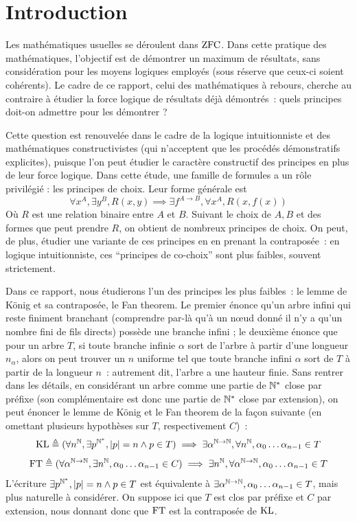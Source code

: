 \documentclass{article}
\begin{document}
\tableofcontents

\section{Introduction}

Les mathématiques usuelles se déroulent dans $\mathrm{ZFC}$. Dans cette pratique des mathématiques, l'objectif est de démontrer un maximum de résultats, sans considération pour les moyens logiques employés (sous réserve que ceux-ci soient cohérents). Le cadre de ce rapport, celui des mathématiques à rebours, cherche au contraire à étudier la force logique de résultats déjà démontrés~: quels principes doit-on admettre pour les démontrer ?

Cette question est renouvelée dans le cadre de la logique intuitionniste et des mathématiques constructivistes (qui n'acceptent que les procédés démonstratifs explicites), puisque l'on peut étudier le caractère constructif des principes en plus de leur force logique. Dans cette étude, une famille de formules a un rôle privilégié : les principes de choix. Leur forme générale est
\[\forall x^A, \exists y^B, R(x,y) \implies \exists f^{A\to B}, \forall x^A, R(x,f(x))\]
Où $R$ est une relation binaire entre $A$ et $B$. Suivant le choix de $A,B$ et des formes que peut prendre $R$, on obtient de nombreux principes de choix. On peut, de plus, étudier une variante de ces principes en en prenant la contraposée~: en logique intuitionniste, ces ``principes de co-choix'' sont plus faibles, souvent strictement.

Dans ce rapport, nous étudierons l'un des principes les plus faibles~: le lemme de König et sa contraposée, le Fan theorem. Le premier énonce qu'un arbre infini qui reste finiment branchant (comprendre par-là qu'à un n\oe ud donné il n'y a qu'un nombre fini de fils directs) possède une branche infini ; le deuxième énonce que pour un arbre $T$, si toute branche infinie $\alpha$ sort de l'arbre à partir d'une longueur $n_\alpha$, alors on peut trouver un $n$ uniforme tel que toute branche infini $\alpha$ sort de $T$ à partir de la longueur $n$~: autrement dit, l'arbre a une hauteur finie. Sans rentrer dans les détails, en considérant un arbre comme une partie de $\mathbb{N}^*$ close par préfixe (son complémentaire est donc une partie de $\mathbb{N}^*$ close par extension), on peut énoncer le lemme de König et le Fan theorem de la façon suivante (en omettant plusieurs hypothèses sur $T$, respectivement $C$)~:
\[\mathrm{KL} \triangleq (\forall n^{\mathbb{N}}, \exists p^{\mathbb{N}^*}, |p| = n \land p \in T) \implies \exists \alpha^{\mathbb{N}\to\mathbb{N}}, \forall n^{\mathbb{N}}, \alpha_0\ldots\alpha_{n-1}\in T\]
\[\mathrm{FT} \triangleq (\forall \alpha^{\mathbb{N}\to\mathbb{N}}, \exists n^{\mathbb{N}}, \alpha_0\ldots \alpha_{n-1}\in C)\implies \exists n^{\mathbb{N}}, \forall \alpha^{\mathbb{N}\to\mathbb{N}}, \alpha_0\ldots\alpha_{n-1}\in T\]
L'écriture $\exists p^{\mathbb{N}^*},|p| = n \land p \in T$ est équivalente à $\exists \alpha^{\mathbb{N}\to\mathbb{N}}, \alpha_0\ldots\alpha_{n-1}\in T$, mais plus naturelle à considérer. On suppose ici que $T$ est clos par préfixe et $C$ par extension, nous donnant donc que $\mathrm{FT}$ est la contraposée de $\mathrm{KL}$.
\end{document}

